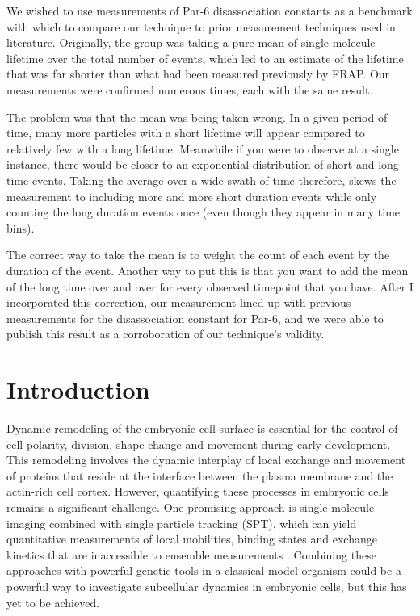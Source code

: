 We wished to use measurements of Par-6 disassociation constants as a benchmark with which to compare our technique to prior measurement techniques used in literature.  Originally, the group was taking a pure mean of single molecule lifetime over the total number of events, which led to an estimate of the lifetime that was far shorter than what had been measured previously by FRAP.  Our measurements were confirmed numerous times, each with the same result.  

The problem was that the mean was being taken wrong.  In a given period of time, many more particles with a short lifetime will appear compared to relatively few with a long lifetime.  Meanwhile if you were to observe at a single instance, there would be closer to an exponential distribution of short and long time events. Taking the average over a wide swath of time therefore, skews the measurement to including more and more short duration events while only counting the long duration events once (even though they appear in many time bins).

The correct way to take the mean is to weight the count of each event by the duration of the event.  Another way to put this is that you want to add the mean of the long time over and over for every observed timepoint that you have.  After I incorporated this correction, our measurement lined up with previous measurements for the disassociation constant for Par-6, and we were able to publish this result as a corroboration of our technique's validity.

\section{Introduction}
 
 Dynamic remodeling of the embryonic cell surface is essential for the control of cell polarity, division, shape change and movement during early development. This remodeling involves the dynamic interplay of local exchange and movement of proteins that reside at the interface between the plasma membrane and the actin-rich cell cortex. However, quantifying these processes in embryonic cells remains a significant challenge. One promising approach is single molecule imaging combined with single particle tracking (SPT), which can yield quantitative measurements of local mobilities, binding states and exchange kinetics that are inaccessible to ensemble measurements \cite{nmeth1,nmeth2,nmeth3}. Combining these approaches with powerful genetic tools in a classical model organism could be a powerful way to investigate subcellular dynamics in embryonic cells, but this has yet to be achieved.
 
